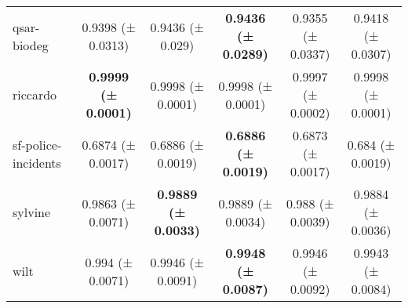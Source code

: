 \documentclass[11pt]{article}
\begin{document}
\begin{table}[]
{\begin{tabular}{@{}lccccc@{}}
qsar-biodeg         & 0.9398 (± 0.0313)          & 0.9436 (± 0.029)           & \textbf{0.9436 (± 0.0289)} & 0.9355 (± 0.0337)          & 0.9418 (± 0.0307)          \\
riccardo            & \textbf{0.9999 (± 0.0001)} & 0.9998 (± 0.0001)          & 0.9998 (± 0.0001)          & 0.9997 (± 0.0002)          & 0.9998 (± 0.0001)          \\
sf-police-incidents & 0.6874 (± 0.0017)          & 0.6886 (± 0.0019)          & \textbf{0.6886 (± 0.0019)} & 0.6873 (± 0.0017)          & 0.684 (± 0.0019)           \\
sylvine             & 0.9863 (± 0.0071)          & \textbf{0.9889 (± 0.0033)} & 0.9889 (± 0.0034)          & 0.988 (± 0.0039)           & 0.9884 (± 0.0036)          \\
wilt                & 0.994 (± 0.0071)           & 0.9946 (± 0.0091)          & \textbf{0.9948 (± 0.0087)} & 0.9946 (± 0.0092)          & 0.9943 (± 0.0084)          \\ \bottomrule
\end{tabular}%
}
\end{table}
\end{document}
